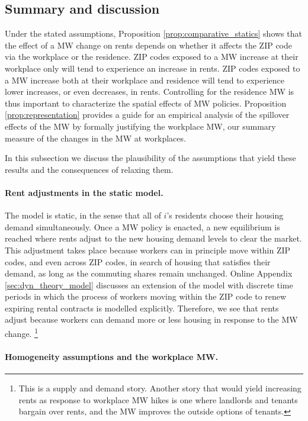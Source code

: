\subsection{Summary and discussion}

Under the stated assumptions, Proposition \ref{prop:comparative_statics} shows 
that the effect of a MW change on rents depends on whether it affects the 
ZIP code via the workplace or the residence.
ZIP codes exposed to a MW increase at their workplace only will tend to 
experience an increase in rents.
ZIP codes exposed to a MW increase both at their workplace and residence 
will tend to experience lower increases, or even decreases, in rents.
Controlling for the residence MW is thus important to characterize the spatial 
effects of MW policies.
Proposition \ref{prop:representation} provides a guide for an empirical
analysis of the spillover effects of the MW by formally justifying 
the workplace MW, our summary measure of the changes in the MW at workplaces.

In this subsection we discuss the plausibility of the assumptions that yield 
these results and the consequences of relaxing them.

\paragraph{Rent adjustments in the static model.}

The model is static, in the sense that all of $i$'s residents choose their 
housing demand simultaneously.
Once a MW policy is enacted, a new equilibrium is reached where rents adjust
to the new housing demand levels to clear the market.
This adjustment takes place because workers can in principle move within ZIP 
codes, and even across ZIP codes, in search of housing that satisfies their 
demand, as long as the commuting shares remain unchanged.
Online Appendix \ref{sec:dyn_theory_model} discusses an extension of the model
with discrete time periods in which the process of workers moving within the 
ZIP code to renew expiring rental contracts is modelled explicitly.
Therefore, we see that rents adjust because workers can demand more or less 
housing in response to the MW change.%
\footnote{This is a supply and demand story. 
    Another story that would yield increasing rents as response to workplace MW
    hikes is one where landlords and tenants bargain over rents, 
    and the MW improves the outside options of tenants.}

\paragraph{Homogeneity assumptions and the workplace MW.}

